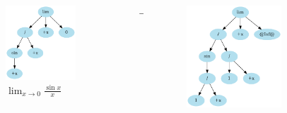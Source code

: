 \documentclass[aspectratio=149]{beamer}
\begin{document}
	\begin{frame}
		\begin{columns}
			\begin{column}{0.45\textwidth}
				\begin{figure}
					\includegraphics[width=0.8\textwidth]{pres_img/start.png}
					\caption{\(\lim_{x \to 0}{\frac{\sin{x}}{x}}\)}
				\end{figure}
			\end{column}
			\begin{column}{0.1\textwidth}
				\begin{center}
					$\rightarrow$
				\end{center}
			\end{column}
			\begin{column}{0.45\textwidth}
				\begin{figure}
					\includegraphics[width=0.8\textwidth]{pres_img/riformulato.png}

\end{figure}
\end{column}
\end{columns}
\end{frame}
\end{document}
